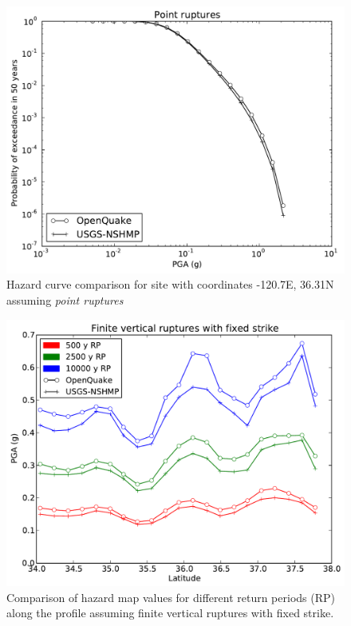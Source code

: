 \begin{figure}[!h]
\centering
\includegraphics[width=12.5cm]{./qareport/pictures/-120pt7_36pt31_point.pdf}
\caption{Hazard curve comparison for site with coordinates -120.7E, 36.31N assuming \textit{point ruptures}}
\label{fig:cal_grid_curve_point}
\end{figure}

\begin{figure}[!ht]
\centering
\includegraphics[width=12.5cm]{./qareport/pictures/gridded_seismicity_oq_nshmp_fixedstrikevertical.pdf}
\caption{Comparison of hazard map values for different return periods (RP) along the profile assuming finite vertical ruptures with fixed strike.}
\label{fig:cal_grid_map_finite}
\end{figure}

